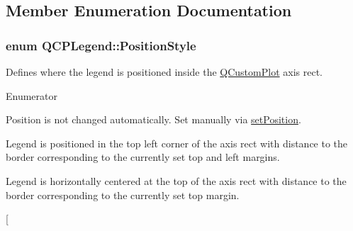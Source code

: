 \subsection{Member Enumeration Documentation}
\hypertarget{classQCPLegend_aa61c3d82a6c7942dddefbf1ed1f7049f}{
\subsubsection[{Position\-Style}]{\setlength{\rightskip}{0pt plus 5cm}enum {\bf Q\-C\-P\-Legend\-::\-Position\-Style}}}\label{classQCPLegend_aa61c3d82a6c7942dddefbf1ed1f7049f}
Defines where the legend is positioned inside the \hyperlink{classQCustomPlot}{Q\-Custom\-Plot} axis rect. \begin{Desc}
\item[Enumerator]\par
\begin{description}
\item[{\em 
\hypertarget{classQCPLegend_aa61c3d82a6c7942dddefbf1ed1f7049fadfd57c395cae91cd95231c926c0a38ca}{ps\-Manual}\label{classQCPLegend_aa61c3d82a6c7942dddefbf1ed1f7049fadfd57c395cae91cd95231c926c0a38ca}
}]Position is not changed automatically. Set manually via \hyperlink{classQCPLegend_a228788ae4caa5b5b269309bb32b54046}{set\-Position}. \item[{\em 
\hypertarget{classQCPLegend_aa61c3d82a6c7942dddefbf1ed1f7049fa1f5bb82f19be99ee3722a540b76c3c85}{ps\-Top\-Left}\label{classQCPLegend_aa61c3d82a6c7942dddefbf1ed1f7049fa1f5bb82f19be99ee3722a540b76c3c85}
}]Legend is positioned in the top left corner of the axis rect with distance to the border corresponding to the currently set top and left margins. \item[{\em 
\hypertarget{classQCPLegend_aa61c3d82a6c7942dddefbf1ed1f7049fa7ca820289c7938092f497fbd4d706f5d}{ps\-Top}\label{classQCPLegend_aa61c3d82a6c7942dddefbf1ed1f7049fa7ca820289c7938092f497fbd4d706f5d}
}]Legend is horizontally centered at the top of the axis rect with distance to the border corresponding to the currently set top margin. \item[{\em 
}
\end{description}
\end{Desc}

